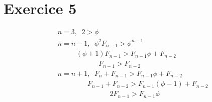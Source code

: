 \documentclass[fontsize=10pt]{article}
\begin{document}
\section*{Exercice 5}
\begin{align*}
& n=3, \phantom{a}2 > \phi \\
& n=n-1, \phantom{a}\phi^2 F_{n-1} > \phi^{n-1}\\
& \phantom{aaaaa} (\phi + 1) F_{n-1} > F_{n-1} \phi + F_{n-2}\\
& \phantom{aaaaaaaaaaa} F_{n-1} > F_{n-2}\\
& n=n+1, \phantom{a}F_n + F_{n-1} > F_{n-1} \phi + F_{n-2}\\
& \phantom{aaaaaaaa} F_{n-1} + F_{n-2} > F_{n-1} (\phi - 1) + F_{n-2}\\
& \phantom{aaaaaaaaaaaaaa} 2 F_{n-1} > F_{n-1} \phi
\end{align*}
\end{document}

